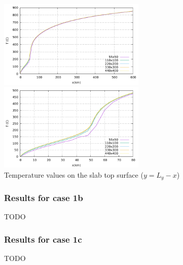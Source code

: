 \begin{center}
\includegraphics[width=7cm]{python_codes/fieldstone_45/images/tempdiag}
\includegraphics[width=7cm]{python_codes/fieldstone_45/images/tempdiag_zoom}\\
{\small Temperature values on the slab top surface ($y=L_y-x$)}
\end{center}



\subsubsection{Results for case 1b}

TODO

\subsubsection{Results for case 1c}

TODO







